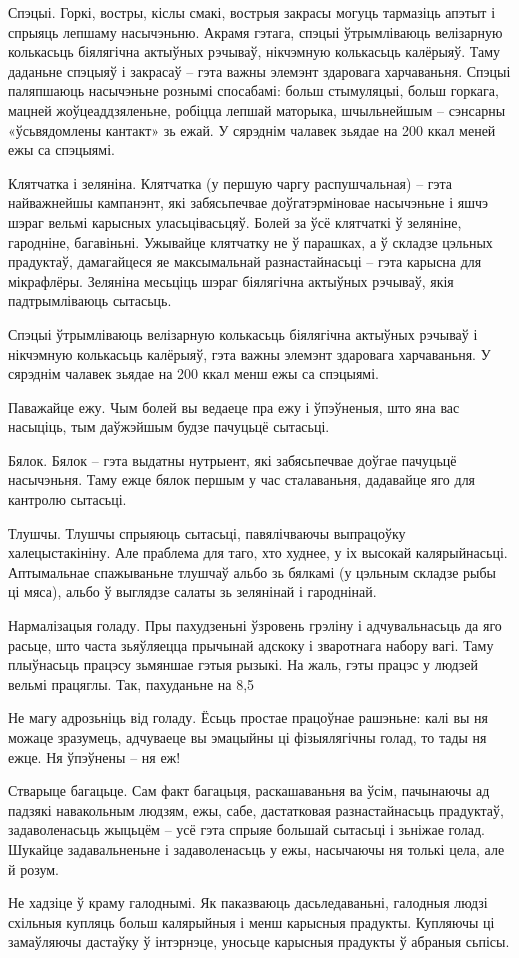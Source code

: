 Спэцыі.
Горкі, востры, кіслы смакі, вострыя закрасы могуць тармазіць апэтыт і спрыяць лепшаму насычэньню. Акрамя гэтага, спэцыі ўтрымліваюць велізарную колькасьць біялягічна актыўных рэчываў, нікчэмную колькасьць калёрыяў. Таму даданьне спэцыяў і закрасаў – гэта важны элемэнт здаровага харчаваньня. Спэцыі паляпшаюць насычэньне рознымі спосабамі: больш стымуляцыі, больш горкага, мацней жоўцеаддзяленьне, робіцца лепшай маторыка, шчыльнейшым – сэнсарны «ўсьвядомлены кантакт» зь ежай. У сярэднім чалавек зьядае на 200 ккал меней ежы са спэцыямі.

Клятчатка і зеляніна.
Клятчатка (у першую чаргу распушчальная) – гэта найважнейшы кампанэнт, які забясьпечвае доўгатэрміновае насычэньне і яшчэ шэраг вельмі карысных уласьцівасьцяў. Болей за ўсё клятчаткі ў зеляніне, гародніне, багавіньні. Ужывайце клятчатку не ў парашках, а ў складзе цэльных прадуктаў, дамагайцеся яе максымальнай разнастайнасьці – гэта карысна для мікрафлёры. Зеляніна месьціць шэраг біялягічна актыўных рэчываў, якія падтрымліваюць сытасьць.

Спэцыі ўтрымліваюць велізарную колькасьць біялягічна актыўных рэчываў і нікчэмную колькасьць калёрыяў, гэта важны элемэнт здаровага харчаваньня. У сярэднім чалавек зьядае на 200 ккал менш ежы са спэцыямі.

Паважайце ежу.
Чым болей вы ведаеце пра ежу і ўпэўненыя, што яна вас насыціць, тым даўжэйшым будзе пачуцьцё сытасьці.

Бялок.
Бялок – гэта выдатны нутрыент, які забясьпечвае доўгае пачуцьцё насычэньня. Таму ежце бялок першым у час сталаваньня, дадавайце яго для кантролю сытасьці.

Тлушчы.
Тлушчы спрыяюць сытасьці, павялічваючы выпрацоўку халецыстакініну. Але праблема для таго, хто худнее, у іх высокай калярыйнасьці. Аптымальнае спажываньне тлушчаў альбо зь бялкамі (у цэльным складзе рыбы ці мяса), альбо ў выглядзе салаты зь зелянінай і гароднінай.

Нармалізацыя голаду.
Пры пахудзеньні ўзровень грэліну і адчувальнасьць да яго расьце, што часта зьяўляецца прычынай адскоку і зваротнага набору вагі. Таму плыўнасьць працэсу зьмяншае гэтыя рызыкі. На жаль, гэты працэс у людзей вельмі працяглы. Так, пахуданьне на 8,5%

Не магу адрозьніць від голаду.
Ёсьць простае працоўнае рашэньне: калі вы ня можаце зразумець, адчуваеце вы эмацыйны ці фізыялягічны голад, то тады ня ежце. Ня ўпэўнены – ня еж!

Стварыце багацьце.
Сам факт багацьця, раскашаваньня ва ўсім, пачынаючы ад падзякі навакольным людзям, ежы, сабе, дастатковая разнастайнасьць прадуктаў, задаволенасьць жыцьцём – усё гэта спрыяе большай сытасьці і зьніжае голад. Шукайце задавальненьне і задаволенасьць у ежы, насычаючы ня толькі цела, але й розум.

Не хадзіце ў краму галоднымі.
Як паказваюць дасьледаваньні, галодныя людзі схільныя купляць больш калярыйныя і менш карысныя прадукты. Купляючы ці замаўляючы дастаўку ў інтэрнэце, уносьце карысныя прадукты ў абраныя сьпісы.
